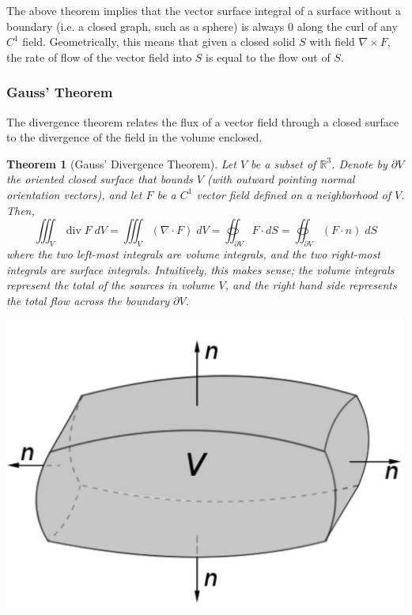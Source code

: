 \documentclass{article}
\DeclareMathOperator{\Div}{div}
\newtheorem{theorem}{Theorem}[section]
\theoremstyle{remark}
\theoremstyle{definition}
\begin{document}
The above theorem implies that the vector surface integral of a surface without a boundary (i.e. a closed graph, such as a sphere) is always $0$ along the curl of any $C^1$ field. Geometrically, this means that given a closed solid $S$ with field $\nabla \times F$, the rate of flow of the vector field into $S$ is equal to the flow out of $S$. 

\subsubsection{Gauss' Theorem}
The divergence theorem relates the flux of a vector field through a closed surface to the divergence of the field in the volume enclosed. 

\begin{theorem}[Gauss' Divergence Theorem]
Let $V$ be a subset of $\mathbb{R}^3$. Denote by $\partial V$ the oriented closed surface that bounds $V$ (with outward pointing normal orientation vectors), and let $F$ be a $C^1$ vector field defined on a neighborhood of $V$. Then, 
\[\iiint_V \Div{F} \; d V = \iiint_V (\nabla \cdot F) \; d V = \oiint_{\partial V} F \cdot d S = \oiint_{\partial V} (F \cdot n) \; dS\]
where the two left-most integrals are volume integrals, and the two right-most integrals are surface integrals. Intuitively, this makes sense; the volume integrals represent the total of the sources in volume $V$, and the right hand side represents the total flow across the boundary $\partial V$. 
\begin{center}
    \includegraphics[scale=0.35]{img/Gauss_Theorem_Volume.png}
\end{center}
\end{theorem}
\end{document}
